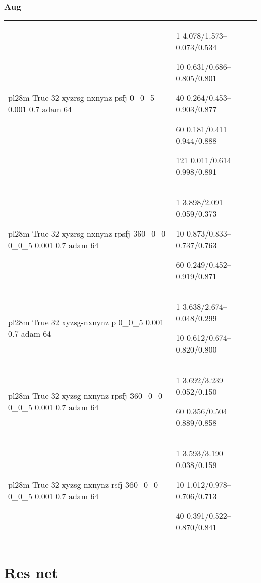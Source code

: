 \documentclass[,table,dvipsnames]{article}
\begin{document}
\subsubsection{Aug}	
\noindent\begin{tabular}{|p{9cm}|p{6cm}| }	
	\hline	
	\rowcolor{yellow}
	pl28m True 32 xyzrsg-nxnynz psfj 0\_0\_5 0.001 0.7 adam 64 & 1 4.078/1.573--0.073/0.534\par 10 0.631/0.686--0.805/0.801\par 40 0.264/0.453--0.903/0.877\par 60 0.181/0.411--0.944/0.888\par 121 0.011/0.614--0.998/0.891\\
	
	\rowcolor{blue!20}
	pl28m True 32 xyzrsg-nxnynz rpsfj-360\_0\_0 0\_0\_5 0.001 0.7 adam 64& 1 3.898/2.091--0.059/0.373\par 10 0.873/0.833--0.737/0.763\par 60 0.249/0.452--0.919/0.871\\
	
	\rowcolor{orange!20}
	pl28m True 32 xyzsg-nxnynz p 0\_0\_5 0.001 0.7 adam 64& 1 3.638/2.674--0.048/0.299\par 10 0.612/0.674--0.820/0.800\\
	
	\rowcolor{blue!20}
	pl28m True 32 xyzsg-nxnynz rpsfj-360\_0\_0 0\_0\_5 0.001 0.7 adam 64& 1 3.692/3.239--0.052/0.150\par 60 0.356/0.504--0.889/0.858\\
	
	\rowcolor{yellow!20}
	pl28m True 32 xyzsg-nxnynz rsfj-360\_0\_0 0\_0\_5 0.001 0.7 adam 64& 1 3.593/3.190--0.038/0.159\par 10 1.012/0.978--0.706/0.713\par 40 0.391/0.522--0.870/0.841\\
	\hline 
\end{tabular}	

\section{Res net}	
\end{document}
